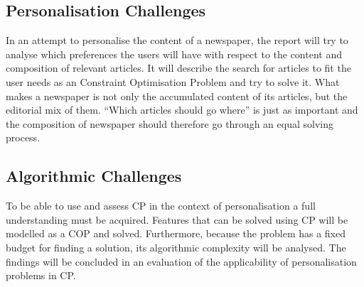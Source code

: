 \subsection{Personalisation Challenges}
In an attempt to personalise the content of a newspaper, the report will try to analyse which preferences the users will have with respect to the content and composition of relevant articles. It will describe the search for articles to fit the user needs as an Constraint Optimisation Problem and try to solve it. What makes a newspaper is not only the accumulated content of its articles, but the editorial mix of them. ``Which articles should go where'' is just as important and the composition of newspaper should therefore go through an equal solving process.

\subsection{Algorithmic Challenges}
To be able to use and assess CP in the context of personalisation a full understanding must be acquired. Features that can be solved using CP will be modelled as a COP and solved. Furthermore, because the problem has a fixed budget for finding a solution, its algorithmic complexity will be analysed. The findings will be concluded in an evaluation of the applicability of personalisation problems in CP.

